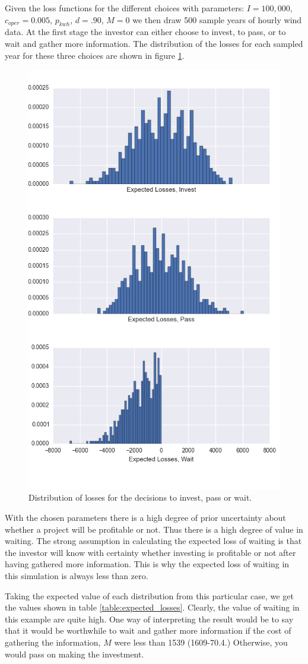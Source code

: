 \documentclass[11pt]{article}
\begin{document}
Given the loss functions for the different choices with parameters: $I=100,000$, $c_{oper}=0.005$, $p_{kwh}$, $d=.90$, $M=0$ we then draw 500 sample years of hourly wind data. At the first stage the investor can either choose to invest, to pass, or to wait and gather more information. The distribution of the losses for each sampled year for these three choices are shown in figure \ref{losses}.

\begin{figure}
	\centering
	\includegraphics[width=.6\textwidth]{figures/losses.png}
	\caption{Distribution of losses for the decisions to invest, pass or wait.}
	\label{losses}
\end{figure}

With the chosen parameters there is a high degree of prior uncertainty about whether a project will be profitable or not. Thus there is a high degree of value in waiting. The strong assumption in calculating the expected loss of waiting is that the investor will know with certainty whether investing is profitable or not after having gathered more information. This is why the expected loss of waiting in this simulation is always less than zero.

Taking the expected value of each distribution from this particular case, we get the values shown in table \ref{table:expected_losses}. Clearly, the value of waiting in this example are quite high. One way of interpreting the result would be to say that it would be worthwhile to wait and gather more information if the cost of gathering the information, $M$ were less than 1539 (1609-70.4.) Otherwise, you would pass on making the investment. 
\end{document}
